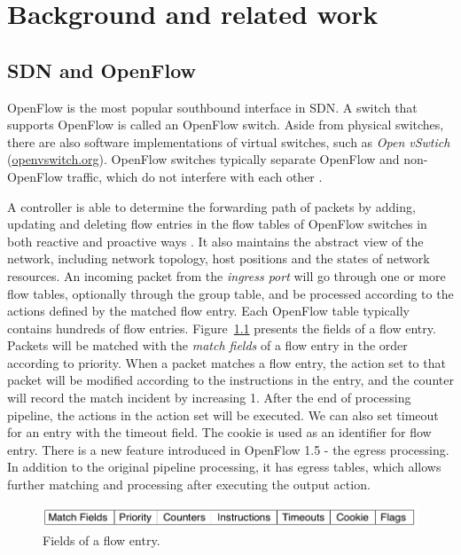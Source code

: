 \chapter{Background and related work}
\section{SDN and OpenFlow}
\label{SDN and OpenFlow}
OpenFlow is the most popular southbound interface in SDN. A switch that supports OpenFlow is called an OpenFlow switch. Aside from physical switches, there are also software implementations of virtual switches, such as \textit{Open vSwtich} (\url{openvswitch.org}). OpenFlow switches typically separate OpenFlow and non-OpenFlow traffic, which do not interfere with each other \cite{HP_SPEC}.

A controller is able to determine the forwarding path of packets by adding, updating and deleting flow entries in the flow tables of OpenFlow switches in both reactive and proactive ways \cite{OF_SPEC}. It also maintains the abstract view of the network, including network topology, host positions and the states of network resources. An incoming packet from the \textit{ingress port} will go through one or more flow tables, optionally through the group table, and be processed according to the actions defined by the matched flow entry. Each OpenFlow table typically contains hundreds of flow entries. Figure~\ref{FE_Col} presents the fields of a flow entry. Packets will be matched with the \textit{match fields} of a flow entry in the order according to priority. When a packet matches a flow entry, the action set to that packet will be modified according to the instructions in the entry, and the counter will record the match incident by increasing 1. After the end of processing pipeline, the actions in the action set will be executed. We can also set timeout for an entry with the timeout field. The cookie is used as an identifier for flow entry. There is a new feature introduced in OpenFlow 1.5 - the egress processing. In addition to the original pipeline processing, it has egress tables, which allows further matching and processing after executing the output action\cite{OF_SPEC_15}. 

\begin{figure}[H]
\begin{center} 
\includegraphics[width=1\textwidth]{figures/columns_of_flow_entry.png}
\end{center}
\caption{Fields of a flow entry.}
\label{FE_Col}
\end{figure}

